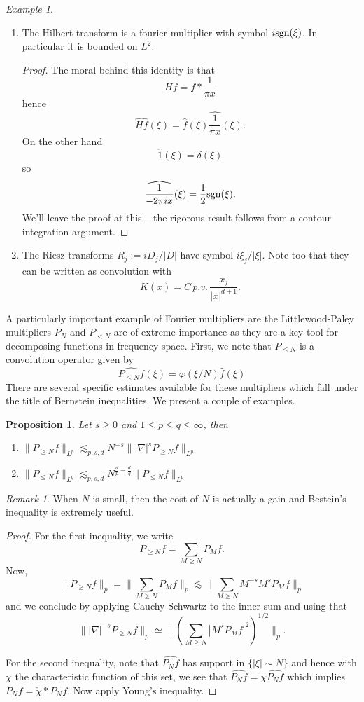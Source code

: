 \documentclass[11pt]{article}
\newtheorem{prop}[thm]{Proposition}
\theoremstyle{remark}
\newtheorem*{ex}{Example}
\newtheorem*{rmk}{Remark}
\newcommand{\1}{\textbf{1}}
\newcommand{\lle}{\lesssim}
\def\norm#1{\| #1  \|}
\begin{document}
\begin{ex}
\begin{enumerate}
\item The Hilbert transform is a fourier multiplier with symbol $i \textup{sgn}(\xi)$. In particular it is bounded on $L^2$.
\begin{proof}
The moral behind this identity is that
\[
Hf = f * \frac{1}{\pi x}
\]
hence
\[
\widehat{Hf}(\xi) = \hat{f}(\xi) \widehat{\frac{1}{\pi x}} (\xi).
\]
On the other hand
\[
\hat{1} (\xi) = \delta(\xi)
\]
so
\[
\widehat{\frac{1}{-2 \pi i x}}(\xi) = \frac{1}{2} \textup{sgn}(\xi).
\] 
We'll leave the proof at this -- the rigorous result follows from a contour integration argument.
\end{proof}
\item The Riesz transforms $R_j := i D_j / |D|$ have symbol $i \xi_j / |\xi|$. Note too that they can be written as convolution with
\[
K(x) = C\, p.v.\, \frac{x_j}{|x|^{d+1}}.
\]
\end{enumerate}
\vspace{4mm}
A particularly important example of Fourier multipliers are the Littlewood-Paley multipliers $P_N$ and $P_{< N}$ are of extreme importance as they are a key tool for decomposing functions in frequency space. First, we note that $P_{\leq N}$ is a convolution operator given by
\[
\widehat{P_{\leq N} f} (\xi) = \varphi(\xi/N) \hat{f}(\xi)
\]
There are several specific estimates available for these multipliers which fall under the title of  Bernstein inequalities. We present a couple of examples.
\begin{prop}
Let $s \geq 0$ and $1 \leq p \leq q \leq \infty$, then
\begin{enumerate}
\item[(i)] $\norm{P_{\geq N} f}_{L^p} \lle_{p,s,d} N^{-s} \norm{|\nabla|^s P_{\geq N} f }_{L^p}$
\item[(ii)] $\norm{P_{\leq N} f}_{L^q} \lle_{p,s,d} N^{\frac{d}{p} - \frac{d}{q}} \norm{P_{\leq N} f }_{L^p}$
\end{enumerate}
\end{prop}
\begin{rmk}
When $N$ is small, then the cost of $N$ is actually a gain and Bestein's inequality is extremely useful.
\end{rmk}
\begin{proof}
For the first inequality, we write
\[
P_{\geq N } f = \sum_{M \geq N} P_M f.
\]
Now,
\[
\norm{P_{\geq N } f}_p =\norm{ \sum_{M \geq N} P_M f}_p  \lle  \norm{\sum_{M \geq N} M^{-s} M^s P_M f}_p
\]
and we conclude by applying Cauchy-Schwartz to the inner sum and using that
\[
\norm{|\nabla|^{-s} P_{\geq N } f}_p \simeq \norm{(\sum_{M \geq N} | M^s P_M f|^2 )^{1/2}}_p.
\]

For the second inequality, note that $\widehat{P_N f}$ has support in $\{|\xi| \sim N\}$ and hence with $\chi$ the characteristic function of this set, we see that $\widehat{P_N f} = \chi \widehat{P_N f}$ which implies $P_N f = \check{\chi} * P_Nf$. Now apply Young's inequality.
\end{proof}
\end{ex}
\end{document}
